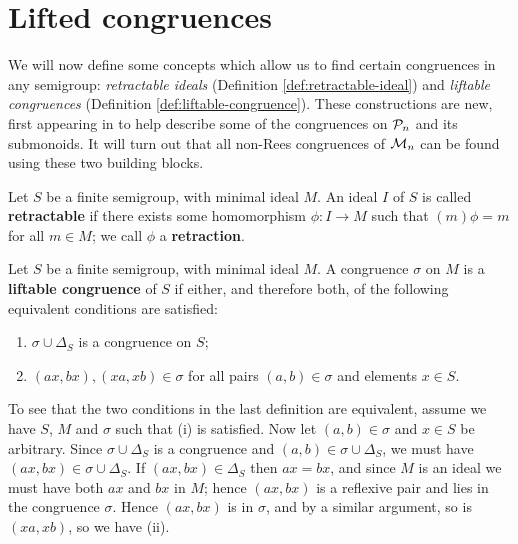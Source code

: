 \section{Lifted congruences}
\label{sec:motzkin-prelim}
We will now define some concepts which allow us to find certain
congruences in any semigroup: \textit{retractable ideals} (Definition
\ref{def:retractable-ideal}) and \textit{liftable congruences} (Definition
\ref{def:liftable-congruence}).  These constructions are new,
first appearing in \cite{ourpaper} to help describe some of the congruences on
$\mathcal{P}_n$ and its submonoids.  It will turn out that all non-Rees congruences
of $\mathcal{M}_n$ can be found using these two building blocks.

\begin{definition}
  \label{def:retractable-ideal}
   
  Let $S$ be a finite semigroup, with minimal ideal $M$.  An ideal $I$ of $S$ is
  called \textbf{retractable} if there exists some homomorphism $\phi: I \to M$
  such that $(m)\phi = m$ for all $m \in M$; we call $\phi$ a
  \textbf{retraction}.
\end{definition}

\begin{definition}
  \label{def:liftable-congruence}
  Let $S$ be a finite semigroup, with minimal ideal $M$.  A congruence $\sigma$
  on $M$ is a \textbf{liftable congruence} of $S$ if either, and therefore both, of
  the following equivalent conditions are satisfied:
  \begin{enumerate}[\rm(i)]
  \item $\sigma \cup \Delta_S$ is a congruence on $S$;
  \item $(ax,bx),(xa,xb) \in \sigma$ for all pairs $(a,b) \in \sigma$ and
    elements $x \in S$.
  \end{enumerate}
\end{definition}

To see that the two conditions in the last definition are equivalent, assume we
have $S$, $M$ and $\sigma$ such that (i) is satisfied.  Now let
$(a,b) \in \sigma$ and $x \in S$ be arbitrary.  Since $\sigma \cup \Delta_S$ is
a congruence and $(a,b) \in \sigma \cup \Delta_S$, we must have
$(ax,bx) \in \sigma \cup \Delta_S$.  If $(ax,bx) \in \Delta_S$ then $ax=bx$, and
since $M$ is an ideal we must have both $ax$ and $bx$ in $M$; hence $(ax,bx)$ is
a reflexive pair and lies in the congruence $\sigma$.  Hence $(ax,bx)$ is in
$\sigma$, and by a similar argument, so is $(xa,xb)$, so we have (ii).

